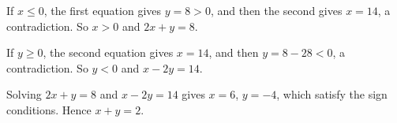 If $x\le0$, the first equation gives $y=8>0$, and then the second gives $x=14$, a contradiction. So $x>0$ and $2x+y=8$.

If $y\ge0$, the second equation gives $x=14$, and then $y=8-28<0$, a contradiction. So $y<0$ and $x-2y=14$.

Solving $2x+y=8$ and $x-2y=14$ gives $x=6$, $y=-4$, which satisfy the sign conditions. Hence $x+y=\boxed{2}$.
